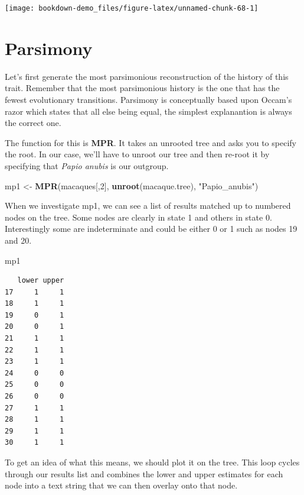 \documentclass[
]{book}
\newenvironment{Shaded}{\begin{snugshade}}{\end{snugshade}}
\newcommand{\DecValTok}[1]{\textcolor[rgb]{0.00,0.00,0.81}{#1}}
\newcommand{\KeywordTok}[1]{\textcolor[rgb]{0.13,0.29,0.53}{\textbf{#1}}}
\newcommand{\NormalTok}[1]{#1}
\newcommand{\StringTok}[1]{\textcolor[rgb]{0.31,0.60,0.02}{#1}}
\begin{document}
\begin{center}\texttt{[image: bookdown-demo\_files/figure-latex/unnamed-chunk-68-1]} \end{center}

\hypertarget{parsimony}{%
\section{Parsimony}\label{parsimony}}

Let's first generate the most parsimonious reconstruction of the history of this trait. Remember that the most parsimonious history is the one that has the fewest evolutionary transitions. Parsimony is conceptually based upon Occam's razor which states that all else being equal, the simplest explanantion is always the correct one.

The function for this is \textbf{MPR}. It takes an unrooted tree and asks you to specify the root. In our case, we'll have to unroot our tree and then re-root it by specifying that \emph{Papio anubis} is our outgroup.

\begin{Shaded}
\begin{Highlighting}[]
\NormalTok{mp1 \textless{}{-}}\StringTok{ }\KeywordTok{MPR}\NormalTok{(macaques[,}\DecValTok{2}\NormalTok{], }\KeywordTok{unroot}\NormalTok{(macaque.tree), }\StringTok{"Papio\_anubis"}\NormalTok{)}
\end{Highlighting}
\end{Shaded}

When we investigate mp1, we can see a list of results matched up to numbered nodes on the tree. Some nodes are clearly in state 1 and others in state 0. Interestingly some are indeterminate and could be either 0 or 1 such as nodes 19 and 20.

\begin{Shaded}
\begin{Highlighting}[]
\NormalTok{mp1}
\end{Highlighting}
\end{Shaded}

\begin{verbatim}
   lower upper
17     1     1
18     1     1
19     0     1
20     0     1
21     1     1
22     1     1
23     1     1
24     0     0
25     0     0
26     0     0
27     1     1
28     1     1
29     1     1
30     1     1
\end{verbatim}

To get an idea of what this means, we should plot it on the tree. This loop cycles through our results list and combines the lower and upper estimates for each node into a text string that we can then overlay onto that node.
\end{document}
